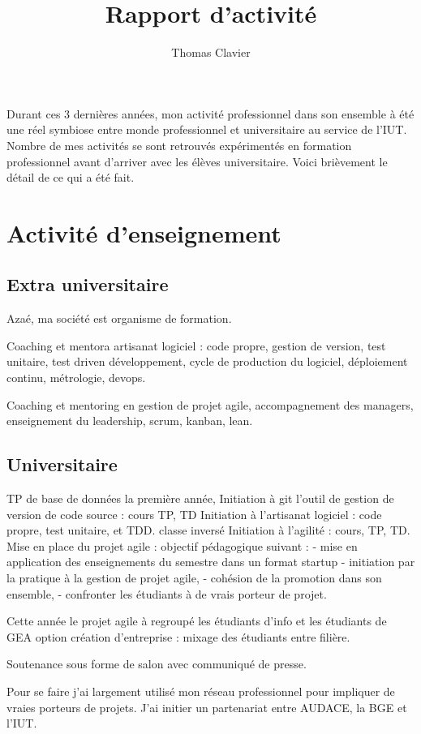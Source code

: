 \documentclass[a4paper]{article}
\title{Rapport d’activité}
\author{Thomas Clavier}
\date{}
\begin{document}
\maketitle

Durant ces 3 dernières années, mon activité professionnel dans son ensemble à été une réel symbiose entre monde professionnel et universitaire au service de l'IUT. 
Nombre de mes activités se sont retrouvés expérimentés en formation professionnel avant d'arriver avec les élèves universitaire.
Voici brièvement le détail de ce qui a été fait.

\section{Activité d'enseignement}
\subsection{Extra universitaire}
Azaé, ma société est organisme de formation.

Coaching et mentora artisanat logiciel : code propre, gestion de version, test unitaire, test driven développement, cycle de production du logiciel, déploiement continu, métrologie, devops.

Coaching et mentoring en gestion de projet agile, accompagnement des managers, enseignement du leadership, scrum, kanban, lean.

\subsection{Universitaire}

TP de base de données la première année,
Initiation à git l'outil de gestion de version de code source : cours TP, TD
Initiation à l'artisanat logiciel : code propre, test unitaire, et TDD.
classe inversé
Initiation à l'agilité : cours, TP, TD.
Mise en place du projet agile : objectif pédagogique suivant : 
- mise en application des enseignements du semestre dans un format startup
- initiation par la pratique à la gestion de projet agile, 
- cohésion de la promotion dans son ensemble,
- confronter les étudiants à de vrais porteur de projet.

Cette année le projet agile à regroupé les étudiants d'info et les étudiants de GEA option création d'entreprise : mixage des étudiants entre filière.

Soutenance sous forme de salon avec communiqué de presse.

Pour se faire j'ai largement utilisé mon réseau professionnel pour impliquer de vraies porteurs de projets. 
J'ai initier un partenariat entre AUDACE, la BGE et l'IUT.
\end{document}
